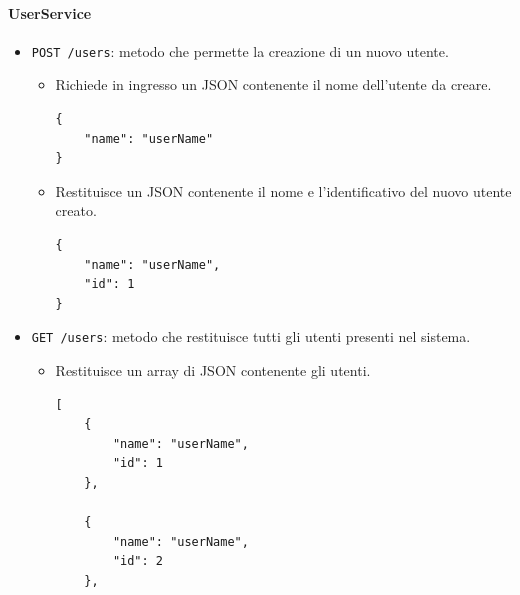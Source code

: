 \documentclass[a4paper]{article}
\begin{document}
\paragraph{UserService}
\begin{itemize}
    \item \texttt{POST /users}: metodo che permette la creazione di un nuovo utente.
    \begin{itemize}
        \item Richiede in ingresso un JSON contenente il nome dell'utente da creare.
        \begin{verbatim}
{
    "name": "userName"
}
        \end{verbatim}
        \item Restituisce un JSON contenente il nome e l'identificativo del nuovo utente creato.
        \begin{verbatim}
{
    "name": "userName",
    "id": 1
}
        \end{verbatim}
    \end{itemize} 
    \item \texttt{GET /users}: metodo che restituisce tutti gli utenti presenti nel sistema.
    \begin{itemize}
        \item Restituisce un array di JSON contenente gli utenti.
        \begin{verbatim}
[
    {
        "name": "userName",
        "id": 1
    },
    
    {
        "name": "userName",
        "id": 2
    },
    

\end{verbatim}
\end{itemize}
\end{itemize}
\end{document}
